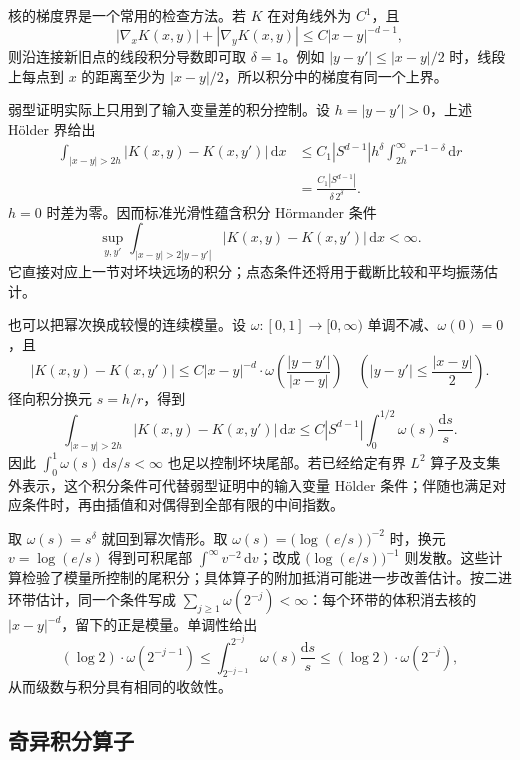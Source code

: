 \ProseParagraphBreak

核的梯度界是一个常用的检查方法。若 \(K\) 在对角线外为 \(C^1\)，且
\[
 |\nabla_xK(x,y)|+|\nabla_yK(x,y)|\leq C|x-y|^{-d-1},
\]
则沿连接新旧点的线段积分导数即可取 \(\delta=1\)。例如 \(|y-y'|\leq|x-y|/2\) 时，线段上每点到 \(x\) 的距离至少为 \(|x-y|/2\)，所以积分中的梯度有同一个上界。

\ProseParagraphBreak

弱型证明实际上只用到了输入变量差的积分控制。设 \(h=|y-y'|>0\)，上述 Hölder 界给出
\[
 \begin{aligned}
 \int_{|x-y|>2h}|K(x,y)-K(x,y')|\,\mathrm dx
 &\leq C_1|S^{d-1}|h^\delta
            \int_{2h}^\infty r^{-1-\delta}\,\mathrm dr\\
 &=\frac{C_1|S^{d-1}|}{\delta\,2^\delta}.
 \end{aligned}
\]
\(h=0\) 时差为零。因而标准光滑性蕴含积分 Hörmander 条件
\[
 \sup_{y,y'}\int_{|x-y|>2|y-y'|}
       |K(x,y)-K(x,y')|\,\mathrm dx<\infty.
\]
它直接对应上一节对坏块远场的积分；点态条件还将用于截断比较和平均振荡估计。

\ProseParagraphBreak

也可以把幂次换成较慢的连续模量。设 \(\omega:[0,1]\to[0,\infty)\) 单调不减、\(\omega(0)=0\)，且
\[
 |K(x,y)-K(x,y')|\leq C|x-y|^{-d}\cdot
 \omega\!\left(\frac{|y-y'|}{|x-y|}\right)
 \quad\left(|y-y'|\leq\frac{|x-y|}2\right).
\]
径向积分换元 \(s=h/r\)，得到
\[
 \int_{|x-y|>2h}|K(x,y)-K(x,y')|\,\mathrm dx
 \leq C|S^{d-1}|\int_0^{1/2}\omega(s)\frac{\mathrm ds}s.
\]
因此 \(\int_0^1\omega(s)\,\mathrm ds/s<\infty\) 也足以控制坏块尾部。若已经给定有界 \(L^2\) 算子及支集外表示，这个积分条件可代替弱型证明中的输入变量 Hölder 条件；伴随也满足对应条件时，再由插值和对偶得到全部有限的中间指数。

\ProseParagraphBreak

取 \(\omega(s)=s^\delta\) 就回到幂次情形。取 \(\omega(s)=\bigl(\log(e/s)\bigr)^{-2}\) 时，换元 \(v=\log(e/s)\) 得到可积尾部 \(\int^\infty v^{-2}\,\mathrm dv\)；改成 \(\bigl(\log(e/s)\bigr)^{-1}\) 则发散。这些计算检验了模量所控制的尾积分；具体算子的附加抵消可能进一步改善估计。按二进环带估计，同一个条件写成
\(\sum_{j\geq1}\omega(2^{-j})<\infty\)：每个环带的体积消去核的 \(|x-y|^{-d}\)，留下的正是模量。单调性给出
\[
 (\log2)\cdot\omega(2^{-j-1})
 \leq\int_{2^{-j-1}}^{2^{-j}}\omega(s)\frac{\mathrm ds}s
 \leq(\log2)\cdot\omega(2^{-j}),
\]
从而级数与积分具有相同的收敛性。

\subsection{奇异积分算子}
\label{b2:subsec:180303}

